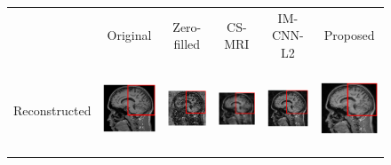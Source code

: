 \documentclass[10pt,journal,compsoc]{IEEEtran}
\begin{document}
\begin{figure}[ht]
	\begin{raggedleft}
		\hspace*{-2cm} \begin{tabular}{cccccc}
			& \multicolumn{1}{c}{\footnotesize Original} & {\footnotesize Zero-filled} & {\footnotesize CS-MRI} & {\footnotesize IM-CNN-L2} & {\footnotesize Proposed}\tabularnewline
			\multirow{1}{0.05cm}[1.8cm]{\begin{turn}{90} {\footnotesize Reconstructed} \end{turn}} &
			
			\includegraphics[width=2.5cm,height=2.5cm]{include/grp2/factor6/022-Guys-0701-T1/022-Guys-0701-T1_images__50} &
			\includegraphics[width=2.5cm,height=2.5cm]{include/grp2/factor6/022-Guys-0701-T1/022-Guys-0701-T1_images__zeroPadding_50} & \includegraphics[width=2.5cm,height=2.5cm]{include/grp2/factor6/022-Guys-0701-T1/022-Guys-0701-T1_images__CS_50} & \includegraphics[width=2.5cm,height=2.5cm]{include/grp2/factor6/022-Guys-0701-T1/022-Guys-0701-T1_images__IMCNNL2TUNE_50} & \includegraphics[width=2.5cm,height=2.5cm]{include/grp2/factor6/022-Guys-0701-T1/022-Guys-0701-T1_images__predict_50}
			

\end{tabular}
\end{raggedleft}
\end{figure}
\end{document}

